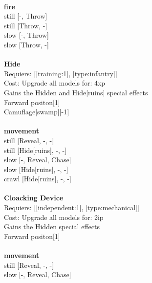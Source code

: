 \ \\ {\bf fire } \\
still [-, Throw] \\
still [Throw, -] \\
slow [-, Throw] \\
slow [Throw, -] \\

\ \\
{\bf Hide } \\

Requiers: [[training:1], [type:infantry]] \\
Cost: Upgrade all models for: 4xp \\
Gains the Hidden and Hide[ruins] special effects\\ 
Forward positon[1]\\ 
Camuflage[swamp][-1]\\ 








\ \\ {\bf movement } \\
still [Reveal, -, -] \\
still [Hide[ruins], -, -] \\
slow [-, Reveal, Chase] \\
slow [Hide[ruins], -, -] \\
crawl [Hide[ruins], -, -] \\

\ \\
{\bf Cloacking Device } \\

Requiers: [[independent:1], [type:mechanical]] \\
Cost: Upgrade all models for: 2ip \\
Gains the Hidden special effects\\ 
Forward positon[1]\\ 








\ \\ {\bf movement } \\
still [Reveal, -, -] \\
slow [-, Reveal, Chase] \\

